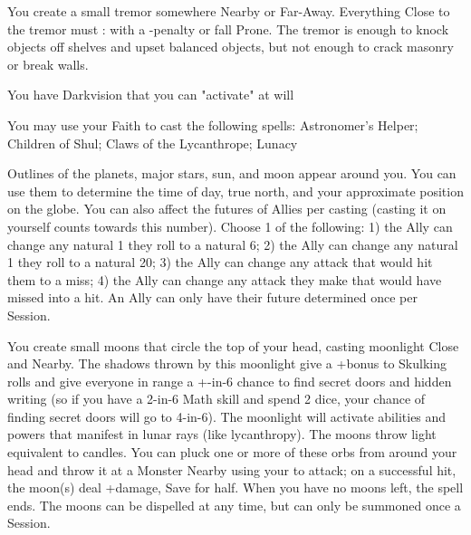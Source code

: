 {\LITURGY [
  Name= Tremor,
  Link=raimonds-liturgy-tremor,
  Paradigm= Elements ,
  Save=  N ,
  Duration= 0 ,
  Counter=  n/a  ,
  Keywords= Contested ,
  Target=   Nearby or Far Away point
]



You create a small tremor somewhere Nearby or Far-Away.  Everything Close to the tremor must \RB : \DEX with a -\DICE penalty or fall Prone.  The tremor is enough to knock objects off shelves and upset balanced objects, but not enough to crack masonry or break walls.



\GOD[
Name=Shul,
Link=small-god-shul,
GodOf=Seraph of Moonlight,
Holy=3 pearl earrings hung from either ear
]


You have Darkvision that you can "activate" at will


You may use your Faith to cast the following spells: Astronomer's Helper; Children of Shul; Claws of the Lycanthrope; Lunacy

\LITURGY [
  Name= Astrologer's Helper,
  Link= shul-liturgy-astrologers-helper,
  Paradigm= Prophesy ,
  Save=  N ,
  Duration= Session ,
  Counter=  n/a  ,
  Keywords= Splittable ,
  Target=   Self / Close creature(s)
]



Outlines of the planets, major stars, sun, and moon appear around you. You can use them to determine the time of day, true north, and your approximate position on the globe. You can also affect the futures of \DICE Allies per casting (casting it on yourself counts towards this number). Choose 1 of the following:  1)  the Ally can change any natural 1 they roll to a natural 6; 2) the Ally can change any natural 1 they roll to a natural 20; 3) the Ally can change any attack that would hit them to a miss; 4) the Ally can change any attack they make that would have missed into a hit.  An Ally can only have their future determined once per Session.

\LITURGY [
  Name= Children of Shul,
  Link=shul-liturgy-children-of-shul,
  Paradigm= Prophesy ,
  Save=  Y (half) ,
  Duration= Session ,
  Counter=  n/a  ,
  Keywords= None ,
  Target=   Self
]



You create \DICE small moons that circle the top of your head, casting moonlight Close and Nearby.  The shadows thrown by this moonlight give a +\DICE bonus to Skulking rolls and give everyone in range a +\DICE-in-6 chance to find secret doors and hidden writing (so if you have a 2-in-6 Math skill and spend 2 dice, your chance of finding secret doors will go to 4-in-6). The moonlight will activate abilities and powers that manifest in lunar rays (like lycanthropy).  The moons throw light equivalent to \DICE candles.
You can pluck one or more of these orbs from around your head and throw it at a Monster Nearby using your \FOC to attack; on a successful hit, the moon(s) deal \SUMDICE+\DICE damage, Save for half.  When you have no moons left, the spell ends.
The moons can be dispelled at any time, but can only be summoned once a Session.

}
